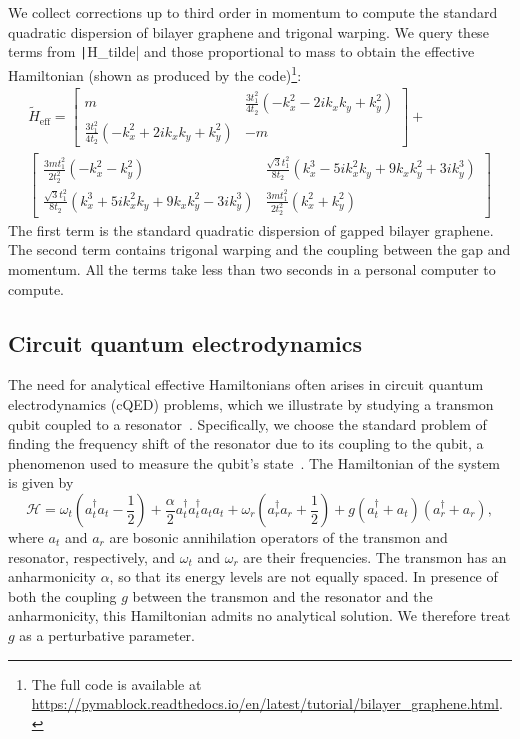 We collect corrections up to third order in momentum to compute the standard
quadratic dispersion of bilayer graphene and trigonal warping.
We query these terms from \texttt|H_tilde| and those proportional
to mass to obtain the effective Hamiltonian (shown as produced by the
code)\footnote{The full code is available at
\url{https://pymablock.readthedocs.io/en/latest/tutorial/bilayer_graphene.html}.}:
%
{\small
\begin{gather}
\tilde{H}_{\textrm{eff}} =
\begin{bmatrix}
m & \frac{3 t_1^2}{4 t_2} ( - k_x^2 - 2ik_x k_y + k_y^2) \\
\frac{3 t_1^2}{4 t_2} ( - k_x^2 + 2ik_x k_y + k_y^2) & -m
\end{bmatrix} + \nonumber \\
\begin{bmatrix}
\frac{3 m t_1^2}{2 t_2^2} ( - k_x^2 - k_y^2) & \frac{\sqrt{3} t_1^2}{8 t_2} (k_x^3 - 5ik_x^2 k_y + 9 k_x k_y^2 + 3ik_y^3) \\
\frac{\sqrt{3} t_1^2}{8 t_2} (k_x^3 + 5ik_x^2 k_y + 9 k_x k_y^2 - 3ik_y^3) & \frac{3 m t_1^2}{2 t_2^2} (k_x^2 + k_y^2)
\end{bmatrix} \nonumber
\end{gather}
}
%
The first term is the standard quadratic dispersion of gapped bilayer
graphene.
The second term contains trigonal warping and the coupling between the gap and
momentum.
All the terms take less than two seconds in a personal computer to compute.

\subsection{Circuit quantum electrodynamics}

The need for analytical effective Hamiltonians often arises in circuit quantum electrodynamics (cQED) problems, which we illustrate by studying a transmon qubit coupled to a resonator~\cite{Krantz_2019}.
Specifically, we choose the standard problem of finding the frequency shift of the resonator due to its coupling to the qubit, a phenomenon used to measure the qubit's state~\cite{Blais_2004}.
The Hamiltonian of the system is given by
%
\begin{equation}
    \label{eq:H_cqed}
    \mathcal{H} =
    \omega_t (a^{\dagger}_{t} a_{t} - \frac{1}{2})
    + \frac{\alpha}{2} a^{\dagger}_{t} a^{\dagger}_{t} a_{t} a_{t} +
    \omega_r (a^{\dagger}_{r} a_{r} + \frac{1}{2}) +
    g (a^{\dagger}_{t} + a_{t}) (a^{\dagger}_{r} + a_{r}),
\end{equation}
%
where $a_t$ and $a_r$ are bosonic annihilation operators of the transmon and resonator, respectively, and $\omega_t$ and $\omega_r$ are their frequencies.
The transmon has an anharmonicity $\alpha$, so that its energy levels are not equally spaced.
In presence of both the coupling $g$ between the transmon and the resonator and the anharmonicity, this Hamiltonian admits no analytical solution.
We therefore treat $g$ as a perturbative parameter.

